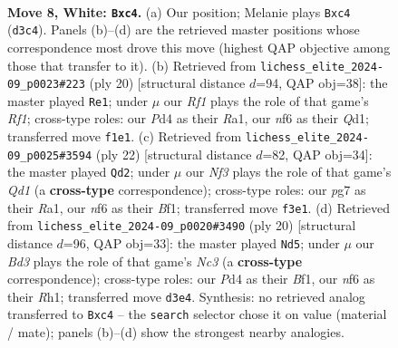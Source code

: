 \documentclass[11pt]{article}
\begin{document}
\begin{figure}[p]\centering
\begin{subfigure}{0.46\textwidth}\centering
\resizebox{\linewidth}{!}{%
\newchessgame
\chessboard[
  setfen={r1bq1b1r/pp1nkppp/2p1pn2/8/2pP4/2NBPN2/PP3PPP/R1BQ1RK1 w - - 2 8},
  showmover=false,
  pgfstyle=straightmove, color=movearrow, markmove={d3-c4}
]}
\caption{}
\end{subfigure}\hfill
\begin{subfigure}{0.46\textwidth}\centering
\resizebox{\linewidth}{!}{%
\newchessgame
\chessboard[
  setfen={r1b1r1k1/ppqnppbp/2p2np1/6B1/3PN3/2PB1N2/PP3PPP/R2Q1RK1 w - - 1 11},
  showmover=false,
  pgfstyle=straightmove, color=movearrow, markmove={f1-e1}
]}
\caption{}
\end{subfigure}
\\[4pt]
\begin{subfigure}{0.46\textwidth}\centering
\resizebox{\linewidth}{!}{%
\newchessgame
\chessboard[
  setfen={r1bqk2r/pp1nnpp1/4p2p/2bpP3/3B1P2/2N2N2/PPP3PP/R2QKB1R w KQkq - 3 12},
  showmover=false,
  pgfstyle=straightmove, color=movearrow, markmove={d1-d2}
]}
\caption{}
\end{subfigure}\hfill
\begin{subfigure}{0.46\textwidth}\centering
\resizebox{\linewidth}{!}{%
\newchessgame
\chessboard[
  setfen={r1b1kb1r/2qn1ppp/p2ppn2/6B1/1p1NPP2/2N5/PPP1Q1PP/1K1R1B1R w kq - 0 11},
  showmover=false,
  pgfstyle=straightmove, color=movearrow, markmove={c3-d5}
]}
\caption{}
\end{subfigure}
\caption{\textbf{Move 8, White: \texttt{Bxc4}.} (a) Our position; Melanie plays \texttt{Bxc4} (\texttt{d3c4}). Panels (b)--(d) are the retrieved master positions whose correspondence most drove this move (highest QAP objective among those that transfer to it). (b) Retrieved from \texttt{lichess\_elite\_2024-09\_p0023\#223} (ply 20) [structural distance $d$=94, QAP obj=38]: the master played \texttt{Re1}; under $\mu$ our \emph{Rf1} plays the role of that game's \emph{Rf1}; cross-type roles: our \emph{P}d4 as their \emph{R}a1, our \emph{n}f6 as their \emph{Q}d1; transferred move \texttt{f1e1}. (c) Retrieved from \texttt{lichess\_elite\_2024-09\_p0025\#3594} (ply 22) [structural distance $d$=82, QAP obj=34]: the master played \texttt{Qd2}; under $\mu$ our \emph{Nf3} plays the role of that game's \emph{Qd1} (a \textbf{cross-type} correspondence); cross-type roles: our \emph{p}g7 as their \emph{R}a1, our \emph{n}f6 as their \emph{B}f1; transferred move \texttt{f3e1}. (d) Retrieved from \texttt{lichess\_elite\_2024-09\_p0020\#3490} (ply 20) [structural distance $d$=96, QAP obj=33]: the master played \texttt{Nd5}; under $\mu$ our \emph{Bd3} plays the role of that game's \emph{Nc3} (a \textbf{cross-type} correspondence); cross-type roles: our \emph{P}d4 as their \emph{B}f1, our \emph{n}f6 as their \emph{R}h1; transferred move \texttt{d3e4}. Synthesis: no retrieved analog transferred to \texttt{Bxc4} -- the \texttt{search} selector chose it on value (material / mate); panels (b)--(d) show the strongest nearby analogies.}
\label{fig:thought-m14}
\end{figure}
\end{document}
